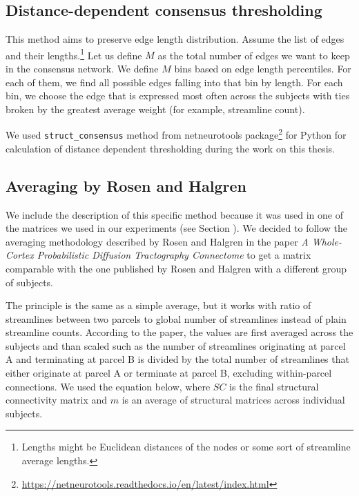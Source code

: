 \subsection{Distance-dependent consensus thresholding}\label{sec:dist-dep}

This method aims to preserve edge length distribution. Assume the list of edges and their lengths.\footnote{Lengths might be Euclidean distances of the nodes or some sort of streamline average lengths.} Let us define $M$ as the total number of edges we want to keep in the consensus network. We define $M$ bins based on edge length percentiles. For each of them, we find all possible edges falling into that bin by length. For each bin, we choose the edge that is expressed most often across the subjects with ties broken by the greatest average weight (for example, streamline count). \cite{betzel_distance-dependent_2019} 

We used \texttt{struct\_consensus} method from netneurotools package\footnote{\url{https://netneurotools.readthedocs.io/en/latest/index.html}} for Python for calculation of distance dependent thresholding during the work on this thesis.

\subsection{Averaging by Rosen and Halgren}\label{sec:rh}

We include the description of this specific method because it was used in one of the matrices we used in our experiments (see Section \TODO). We decided to follow the averaging methodology described by Rosen and Halgren in the paper \textit{A Whole-Cortex Probabilistic Diffusion Tractography Connectome} \cite{rosen_whole-cortex_2021} to get a matrix comparable with the one published by Rosen and Halgren with a different group of subjects.

The principle is the same as a simple average, but it works with ratio of streamlines between two parcels to global number of streamlines instead of plain streamline counts. According to the paper, the values are first averaged across the subjects and than scaled such as the number of streamlines originating at parcel A and terminating at parcel B is divided by the total number of streamlines that either originate at parcel A or terminate at parcel B, excluding within-parcel connections. \cite{rosen_whole-cortex_2021} We used the equation below, where $SC$ is the final structural connectivity matrix and $m$ is an average of structural matrices across individual subjects.

